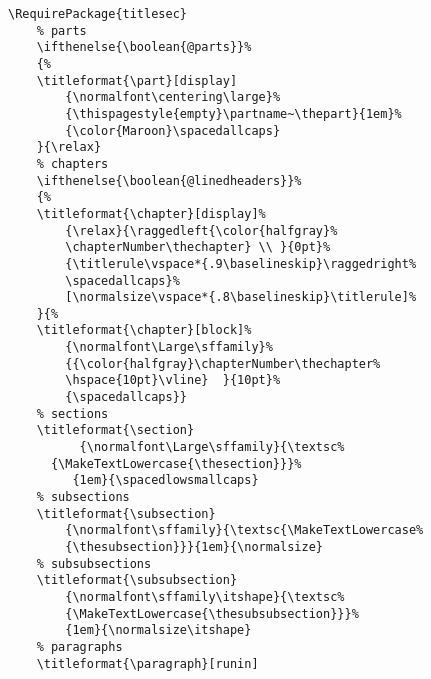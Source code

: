 \begin{lstlisting}
\RequirePackage{titlesec}
	% parts
	\ifthenelse{\boolean{@parts}}%
	{%
    \titleformat{\part}[display]
        {\normalfont\centering\large}%
        {\thispagestyle{empty}\partname~\thepart}{1em}%
        {\color{Maroon}\spacedallcaps}
    }{\relax}
    % chapters
    \ifthenelse{\boolean{@linedheaders}}%
    {%
    \titleformat{\chapter}[display]%
        {\relax}{\raggedleft{\color{halfgray}%
        \chapterNumber\thechapter} \\ }{0pt}%
        {\titlerule\vspace*{.9\baselineskip}\raggedright%
        \spacedallcaps}%
        [\normalsize\vspace*{.8\baselineskip}\titlerule]%
    }{%
    \titleformat{\chapter}[block]%
        {\normalfont\Large\sffamily}%
        {{\color{halfgray}\chapterNumber\thechapter%
        \hspace{10pt}\vline}  }{10pt}%
        {\spacedallcaps}}
    % sections
    \titleformat{\section}
    	  {\normalfont\Large\sffamily}{\textsc%
	  {\MakeTextLowercase{\thesection}}}%
         {1em}{\spacedlowsmallcaps}
    % subsections
    \titleformat{\subsection}
        {\normalfont\sffamily}{\textsc{\MakeTextLowercase%
        {\thesubsection}}}{1em}{\normalsize}
    % subsubsections
    \titleformat{\subsubsection}
        {\normalfont\sffamily\itshape}{\textsc%
        {\MakeTextLowercase{\thesubsubsection}}}%
        {1em}{\normalsize\itshape}
    % paragraphs
    \titleformat{\paragraph}[runin]

\end{lstlisting}
